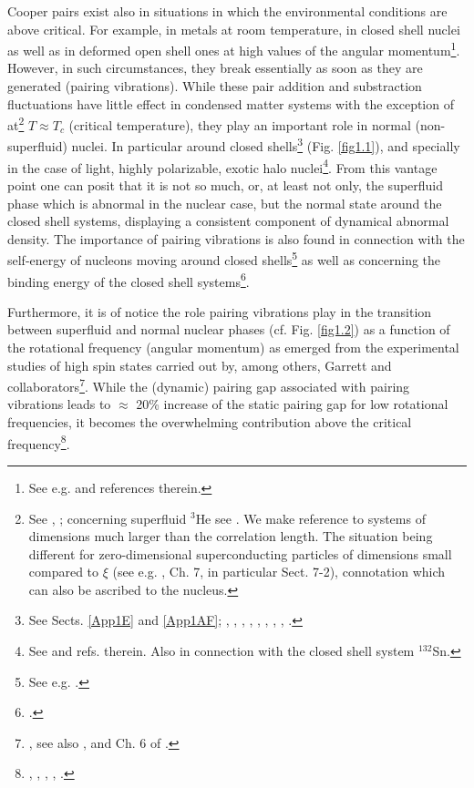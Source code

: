  Cooper pairs exist also in situations in which the environmental conditions are above critical. For example, in metals at room temperature, in closed shell nuclei as well as in deformed open shell ones at high values of the angular momentum\footnote{See e.g. \cite{Shimizu:90} and references therein.}. However, in such circumstances, they break essentially as soon as they are generated (pairing vibrations). While these pair addition and substraction fluctuations have little effect in condensed matter systems with the exception of at\footnote{See \cite{Schmidt:68}, \cite{Schmid:69} \cite{Abrahams:68}; concerning superfluid $^3$He see \cite{Wolfe:78}. We make reference to systems of dimensions much larger than the correlation length. The situation being different for zero-dimensional superconducting particles of dimensions small compared to $\xi$ (see e.g. \cite{Tinkham:96}, Ch. 7, in particular Sect. 7-2), connotation which can also be ascribed to the nucleus.} $T\approx T_c$ (critical temperature), they play an important role in normal (non-superfluid) nuclei. In particular around  closed shells\footnote{See Sects. \ref{App1E} and \ref{App1AF}; \cite{Bohr:64}, \cite{Bes:66}, \cite{Hogassen:61}, \cite{Schmidt:72}, \cite{Schmidt:68}, \cite{Barranco:01}, \cite{Potel:13}, \cite{Potel:14}, \cite{Schmidt:64}.} (Fig. \ref{fig1.1}), and specially in the case of light, highly polarizable, exotic halo nuclei\footnote{See \cite{Potel:13} and refs. therein. Also \cite{Potel:13b} in connection with the closed shell system $^{132}$Sn.}. From this vantage point one can posit that it is not so much, or, at least not only, the superfluid phase which is abnormal in the nuclear case, but the normal state around the closed shell systems, displaying a consistent component of dynamical abnormal density. The importance of pairing vibrations is also found in connection with the self-energy of nucleons moving around closed shells\footnote{See e.g. \cite{Bes:71,Flynn:71}.} as well as concerning the binding energy of the closed shell systems\footnote{\cite{Baroni:04}.}.
 
 
  Furthermore, it is of notice the role pairing vibrations play in the  transition between superfluid and normal nuclear phases (cf. Fig. \ref{fig1.2}) as a function of the rotational frequency (angular momentum) as emerged from the experimental studies of high spin states carried out by, among others, Garrett and collaborators\footnote{\cite{Garrett:85,Garrett:86}, see also \cite{Shimizu:89}, \cite{Barranco:87b} and Ch. 6 of \cite{Brink:05}.}.
 While the (dynamic) pairing gap associated with pairing vibrations leads to  $\approx$ 20\% increase of the static pairing gap for low rotational frequencies, it becomes the overwhelming contribution above the critical frequency\footnote{\cite{Shimizu:89}, \cite{Shimizu:90}, \cite{Shimizu:13},  \cite{Donau:99}, \cite{Shimizu:00}.}.
 
